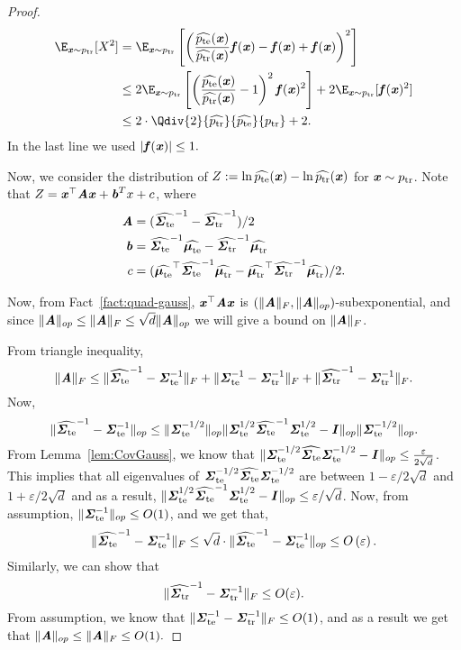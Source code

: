\begin{proof}
\begin{align*}
    \E_{\xx \sim \ptr}[X^2]& = \E_{\xx \sim \ptr}\left[\left(\frac{\widehat{\pte}(\xx)}{\widehat{\ptr}(\xx)}\ff(\xx) - \ff(\xx) + \ff(\xx)\right)^2\right]\\
    & \leq 2\E_{\xx \sim \ptr}\left[\left(\frac{\widehat{\pte}(\xx)}{\widehat{\ptr}(\xx)}-1\right)^2\ff(\xx)^2\right]  + 2\E_{\xx\sim \ptr}[\ff(\xx)^2]\\
    & \leq 2\cdot \Qdiv{2}{\widehat{\ptr}}{\widehat{\pte}}{\ptr} + 2.
\end{align*}
In the last line we used $|\ff(\xx)|\leq 1.$

Now, we consider the distribution of $Z := \ln \widehat{\pte}(\xx) - \ln \widehat{\ptr}(\xx)$ for $\xx\sim \ptr$. Note that $Z = \xx^{\top} \AA \xx + \bb^T x + c$, where 
    \begin{align*}
        \AA & = (\widehat{\ste}^{-1}-\widehat{\str}^{-1})/2 \\
        \bb & =\widehat{\ste}^{-1} \widehat{\mte} - \widehat{\str}^{-1} \widehat{\mtr} \\
        c & = (\widehat{\mte}^{\top} \widehat{\ste}^{-1} \widehat{\mtr} - \widehat{\mtr}^{\top} \widehat{\str}^{-1} \widehat{\mtr})/2.
    \end{align*}
    
    Now, from Fact~\ref{fact:quad-gauss}, $\xx^{\top} \AA \xx$ is $(\|\AA\|_F, \|\AA\|_{op})$-subexponential, and since $\|\AA\|_{op} \leq \|\AA\|_F\leq \sqrt{d}\|\AA\|_{op}$ we will give a bound on $\|\AA\|_{F}$.

    From triangle inequality,
    \[
    \|\AA\|_{F}\leq \|\widehat{\ste}^{-1}-\ste^{-1}\|_{F}+ \|\ste^{-1}-\str^{-1}\|_{F} + \|\widehat{\str}^{-1}-\str^{-1}\|_{F}.
    \]
    Now,
    \[
    \|\widehat{\ste}^{-1}-\ste^{-1}\|_{op} \leq \|\ste^{-1/2}\|_{op}\|\ste^{1/2}\widehat{\ste}^{-1}\ste^{1/2}-\II\|_{op}\|\ste^{-1/2}\|_{op}.
    \]
    From Lemma~\ref{lem:CovGauss}, we know that $\|\ste^{-1/2}\widehat{\ste}\ste^{-1/2}-\II\|_{op} \leq \frac{\varepsilon}{2\sqrt{d}}$. This implies that all eigenvalues of $\ste^{-1/2}\widehat{\ste}\ste^{-1/2}$ are between $1-\varepsilon/2\sqrt{d}$ and $1+\varepsilon/2\sqrt{d}$ and as a result, $\|\ste^{1/2}\widehat{\ste}^{-1}\ste^{1/2}-\II\|_{op} \leq \varepsilon/\sqrt{d}$. Now, from assumption, $\|\ste^{-1}\|_{op} \leq O(1)$, and we get that,
    \[
    \|\widehat{\ste}^{-1}-\ste^{-1}\|_{F}\leq \sqrt{d} \cdot \|\widehat{\ste}^{-1}-\ste^{-1}\|_{op}\leq O\left(\varepsilon\right).
    \]
    Similarly, we can show that 
    \[
    \|\widehat{\str}^{-1}-\str^{-1}\|_{F}\leq O(\varepsilon).
    \]
    From assumption, we know that $\|\ste^{-1}-\str^{-1}\|_{F} \leq O(1)$, and as a result we get that $\|\AA\|_{op}\leq \|\AA\|_F \leq O(1).$


\end{proof}
